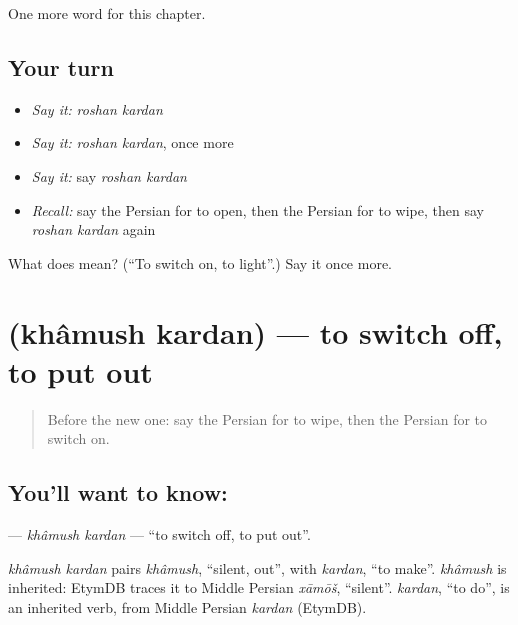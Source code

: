 \begin{grammarlens}[title={What you've built}]
One more word for this chapter.
\end{grammarlens}

\subsection*{Your turn}
\begin{itemize}
\raggedright
  \item \emph{Say it:} \emph{roshan kardan}
  \item \emph{Say it:} \emph{roshan kardan}, once more
  \item \emph{Say it:} say \emph{roshan kardan}
  \item \emph{Recall:} say the Persian for to open, then the Persian for to wipe, then say \emph{roshan kardan} again
\end{itemize}

\begin{tcolorbox}[breakable,colback=teal!4,colframe=teal!35!black,title={Before you move on}]
What does   mean? (\textquotedblleft{}To switch on, to light\textquotedblright{}.) Say it once more.
\end{tcolorbox}
\section[\texorpdfstring{\fa{خاموش} \fa{کردن} (khâmush kardan)}{خاموش کردن (khâmush kardan)}]{  (khâmush kardan) — to switch off, to put out}

\label{lesson:FA-C140-khamush-kardan}



\begin{quote}
Before the new one: say the Persian for to wipe, then the Persian for to switch on.
\end{quote}

\subsection*{You'll want to know:  }
\textbf{ } — \emph{khâmush kardan} — \textquotedblleft{}to switch off, to put out\textquotedblright{}.

\begin{cousinweb}
\emph{khâmush kardan} pairs \emph{khâmush}, \textquotedblleft{}silent, out\textquotedblright{}, with \emph{kardan}, \textquotedblleft{}to make\textquotedblright{}. \emph{khâmush} is inherited: EtymDB traces it to Middle Persian \emph{xāmōš}, \textquotedblleft{}silent\textquotedblright{}. \emph{kardan}, \textquotedblleft{}to do\textquotedblright{}, is an inherited verb, from Middle Persian \emph{kardan} (EtymDB).
\end{cousinweb}

